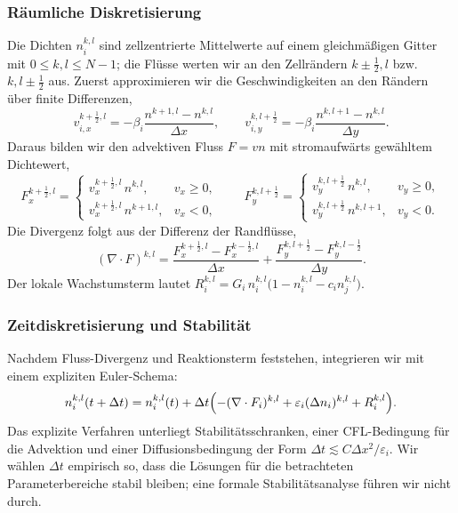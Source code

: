 \documentclass[11pt]{article}
\begin{document}
\subsubsection{Räumliche Diskretisierung}
Die Dichten $n^{k,l}_i$ sind zellzentrierte Mittelwerte auf einem gleichmäßigen
Gitter mit $0 \le k, l \le N - 1$; die Flüsse werten wir an den Zellrändern $k \pm
\tfrac{1}{2}, l$ bzw. $k, l \pm \tfrac{1}{2}$ aus. Zuerst approximieren wir die
Geschwindigkeiten an den Rändern über finite Differenzen,
\begin{equation}
    v^{k + \frac{1}{2}, l}_{i, x} = -\beta_i \frac{n^{k+1, l} - n^{k, l}}{\Delta x},
    \qquad
    v^{k, l + \frac{1}{2}}_{i, y} = -\beta_i \frac{n^{k, l+1} - n^{k, l}}{\Delta y}.
\end{equation}
Daraus bilden wir den advektiven Fluss $F = v n$ mit stromaufwärts gewähltem
Dichtewert,
\begin{equation}
    F^{k + \frac{1}{2}, l}_x =
    \begin{cases}
        v^{k + \frac{1}{2}, l}_x\, n^{k, l},   & v_x \ge 0, \\[3pt]
        v^{k + \frac{1}{2}, l}_x\, n^{k+1, l}, & v_x < 0,
    \end{cases}
    \qquad
    F^{k, l + \frac{1}{2}}_y =
    \begin{cases}
        v^{k, l + \frac{1}{2}}_y\, n^{k, l},   & v_y \ge 0, \\[3pt]
        v^{k, l + \frac{1}{2}}_y\, n^{k, l+1}, & v_y < 0.
    \end{cases}
\end{equation}
Die Divergenz folgt aus der Differenz der Randflüsse,
\begin{equation}
    (\nabla \cdot F)^{k, l}
    = \frac{F^{k + \frac{1}{2}, l}_x - F^{k - \frac{1}{2}, l}_x}{\Delta x}
    + \frac{F^{k, l + \frac{1}{2}}_y - F^{k, l - \frac{1}{2}}_y}{\Delta y}.
\end{equation}
Der lokale Wachstumsterm lautet $R^{k, l}_i = G_i\, n^{k, l}_i \bigl(1 - n^{k, l}_i
- c_i n^{k, l}_j\bigr)$.

\subsubsection{Zeitdiskretisierung und Stabilität}
Nachdem Fluss-Divergenz und Reaktionsterm feststehen, integrieren wir mit einem
expliziten Euler-Schema:
\begin{equation}
    n^{k, l}_i(t + \Delta t) = n^{k, l}_i(t) + \Delta t \Bigl(
    -(\nabla \cdot F_i)^{k, l} + \varepsilon_i (\Delta n_i)^{k, l} + R^{k, l}_i
    \Bigr).
\end{equation}
Das explizite Verfahren unterliegt Stabilitätsschranken, einer CFL-Bedingung für
die Advektion und einer Diffusionsbedingung der Form $\Delta t \lesssim C \Delta
x^2 / \varepsilon_i$. Wir wählen $\Delta t$ empirisch so, dass die Lösungen für die
betrachteten Parameterbereiche stabil bleiben; eine formale Stabilitätsanalyse
führen wir nicht durch.
\end{document}
